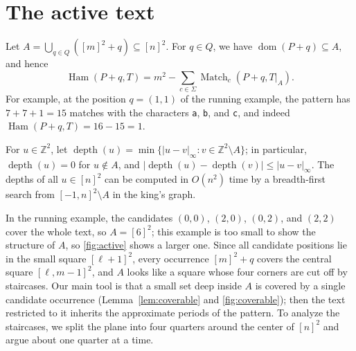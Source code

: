 \documentclass[11pt]{article}
\theoremstyle{definition}
\newcommand{\Z}{\mathbb{Z}}
\renewcommand{\O}{O}
\DeclareMathOperator{\Ham}{Ham}
\DeclareMathOperator{\Match}{Match}
\DeclareMathOperator{\dom}{dom}
\DeclareMathOperator{\depth}{depth}
\newcommand{\abs}[1]{\lvert #1 \rvert}
\newcommand{\inorm}[1]{\lvert #1 \rvert_\infty}
\newcommand{\str}[1]{\texttt{#1}}
\begin{document}
\section{The active text}
\label{sec:active}

Let $A = \bigcup_{q \in Q}([m]^2 + q) \subseteq [n]^2$. For $q \in Q$, we have $\dom(P+q) \subseteq A$, and hence
\begin{equation}\label{eq:ham_match}
\Ham(P+q, T) = m^2 - \textstyle\sum_{c \in \Sigma} \Match_c(P + q, T|_A).
\end{equation}
For example, at the position $q = (1,1)$ of the running example, the pattern has $7 + 7 + 1 = 15$ matches with the characters \str{a}, \str{b}, and \str{c}, and indeed $\Ham(P + q, T) = 16 - 15 = 1$.

For $u \in \Z^2$, let $\depth(u) = \min\{\inorm{u - v} : v \in \Z^2 \setminus A\}$; in particular, $\depth(u) = 0$ for $u \notin A$, and $\abs{\depth(u) - \depth(v)} \le \inorm{u - v}$.
The depths of all $u \in [n]^2$ can be computed in $\O(n^2)$ time by a breadth-first search from $[-1,n]^2 \setminus A$ in the king's graph.

In the running example, the candidates $(0,0)$, $(2,0)$, $(0,2)$, and $(2,2)$ cover the whole text, so $A = [6]^2$; this example is too small to show the structure of $A$, so \autoref{fig:active} shows a larger one.
Since all candidate positions lie in the small square $[\ell+1]^2$, every occurrence $[m]^2 + q$ covers the central square $[\ell, m-1]^2$, and $A$ looks like a square whose four corners are cut off by staircases.
Our main tool is that a small set deep inside $A$ is covered by a single candidate occurrence (Lemma~\ref{lem:coverable} and \autoref{fig:coverable}); then the text restricted to it inherits the approximate periods of the pattern.
To analyze the staircases, we split the plane into four quarters around the center of $[n]^2$ and argue about one quarter at a time.
\end{document}
